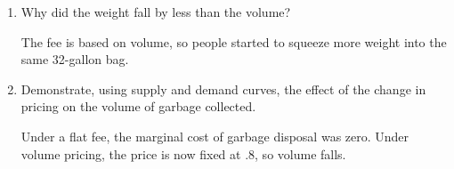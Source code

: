 \documentclass{exam}
\begin{document}
\begin{questions}
\begin{enumerate}
\item Why did the weight fall by less than the volume?
\begin{solution} The fee is based on volume, so people started to squeeze more weight into the same 32-gallon bag. \end{solution}

\item Demonstrate, using supply and demand curves, the effect of the change in pricing on the volume of garbage collected.
\begin{solution} Under a flat fee, the marginal cost of garbage disposal was zero. Under volume pricing, the price is now fixed at .8, so volume falls. \end{solution}

\end{enumerate}

\end{questions}
\end{document}

